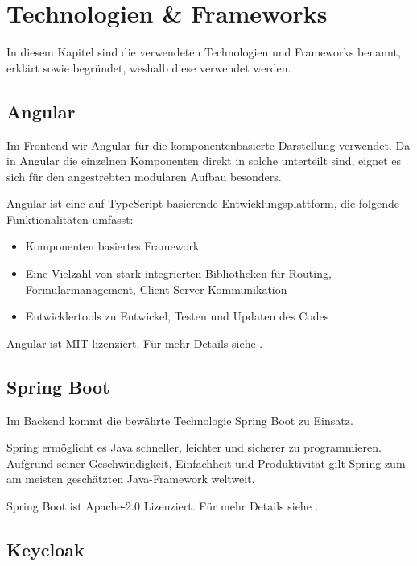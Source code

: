 \chapter{Technologien & Frameworks}\label{ch:technologien-&-frameworks}

In diesem Kapitel sind die verwendeten Technologien und Frameworks benannt, erklärt
sowie begründet, weshalb diese verwendet werden.

\section{Angular}\label{sec:angular}

Im Frontend wir Angular für die komponentenbasierte Darstellung verwendet.
Da in Angular die einzelnen Komponenten direkt in solche unterteilt sind,
eignet es sich für den angestrebten modularen Aufbau besonders.

Angular ist eine auf \gls{TypeScript} basierende Entwicklungsplattform, die folgende Funktionalitäten umfasst:
\begin{itemize}
    \item Komponenten basiertes Framework
    \item Eine Vielzahl von stark integrierten Bibliotheken für Routing, Formularmanagement, Client-Server Kommunikation
    \item Entwicklertools zu Entwickel, Testen und Updaten des Codes
\end{itemize}
\cite{about-angular}

Angular ist MIT lizenziert.
Für mehr Details siehe .

\section{Spring Boot}\label{sec:spring-boot}

Im Backend kommt die bewährte Technologie Spring Boot zu Einsatz.

Spring ermöglicht es Java schneller, leichter und sicherer zu programmieren.
Aufgrund seiner Geschwindigkeit, Einfachheit und Produktivität gilt Spring zum am meisten geschätzten Java-Framework weltweit.
\cite{about-springboot}

Spring Boot ist Apache-2.0 Lizenziert.
Für mehr Details siehe .

\section{Keycloak}\label{sec:keycloak}

